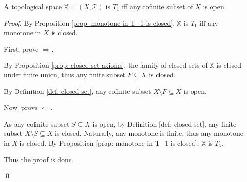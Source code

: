 \begin{proposition}
	A topological space $\mathbb X = (X, \mathcal T)$ is $T_1$ iff any cofinite subset of $X$ is open.
	
	\begin{proof}
		By Proposition \ref{prop: monotone in T_1 is closed}, $\mathbb X$ is $T_1$ iff any monotone in $X$ is closed.
		
		First, prove $\Rightarrow$.
		
		By Proposition \ref{prop: closed set axioms}, the family of closed sets of $\mathbb X$ is closed under finite union, thus any finite subset $F \subseteq X$ is closed.
		
		By Definition \ref{def: closed set}, any cofinite subset $X \setminus F \subseteq X$ is open.
		
		\qedlm
		
		Now, prove $\Leftarrow$.
		
		As any cofinite subset $S \subseteq X$ is open, by Definition \ref{def: closed set}, any finite subset $X \setminus S \subseteq X$ is closed. Naturally, any monotone is finite, thus any monotone in $X$ is closed. By Proposition \ref{prop: monotone in T_1 is closed}, $\mathbb X$ is $T_1$.
		
		\qedlm
		
		Thus the proof is done.
		
		\qed
	\end{proof}
\end{proposition}





























\begin{appendices}
		
\end{appendices}
